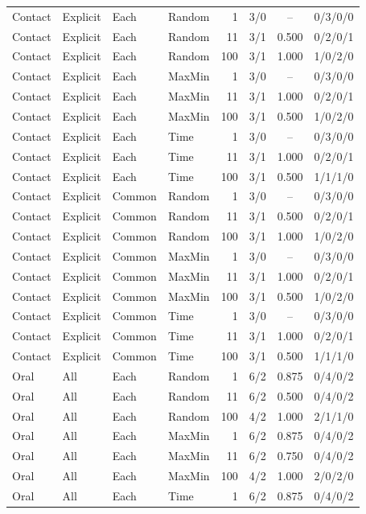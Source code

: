 \begin{longtable}{llllrrcc}
Contact & Explicit & Each & Random & 1 & 3/0 & -- & 0/3/0/0 \\
Contact & Explicit & Each & Random & 11 & 3/1 & 0.500 & 0/2/0/1 \\
Contact & Explicit & Each & Random & 100 & 3/1 & 1.000 & 1/0/2/0 \\
Contact & Explicit & Each & MaxMin & 1 & 3/0 & -- & 0/3/0/0 \\
Contact & Explicit & Each & MaxMin & 11 & 3/1 & 1.000 & 0/2/0/1 \\
Contact & Explicit & Each & MaxMin & 100 & 3/1 & 0.500 & 1/0/2/0 \\
Contact & Explicit & Each & Time & 1 & 3/0 & -- & 0/3/0/0 \\
Contact & Explicit & Each & Time & 11 & 3/1 & 1.000 & 0/2/0/1 \\
Contact & Explicit & Each & Time & 100 & 3/1 & 0.500 & 1/1/1/0 \\
Contact & Explicit & Common & Random & 1 & 3/0 & -- & 0/3/0/0 \\
Contact & Explicit & Common & Random & 11 & 3/1 & 0.500 & 0/2/0/1 \\
Contact & Explicit & Common & Random & 100 & 3/1 & 1.000 & 1/0/2/0 \\
Contact & Explicit & Common & MaxMin & 1 & 3/0 & -- & 0/3/0/0 \\
Contact & Explicit & Common & MaxMin & 11 & 3/1 & 1.000 & 0/2/0/1 \\
Contact & Explicit & Common & MaxMin & 100 & 3/1 & 0.500 & 1/0/2/0 \\
Contact & Explicit & Common & Time & 1 & 3/0 & -- & 0/3/0/0 \\
Contact & Explicit & Common & Time & 11 & 3/1 & 1.000 & 0/2/0/1 \\
Contact & Explicit & Common & Time & 100 & 3/1 & 0.500 & 1/1/1/0 \\
Oral & All & Each & Random & 1 & 6/2 & 0.875 & 0/4/0/2 \\
Oral & All & Each & Random & 11 & 6/2 & 0.500 & 0/4/0/2 \\
Oral & All & Each & Random & 100 & 4/2 & 1.000 & 2/1/1/0 \\
Oral & All & Each & MaxMin & 1 & 6/2 & 0.875 & 0/4/0/2 \\
Oral & All & Each & MaxMin & 11 & 6/2 & 0.750 & 0/4/0/2 \\
Oral & All & Each & MaxMin & 100 & 4/2 & 1.000 & 2/0/2/0 \\
Oral & All & Each & Time & 1 & 6/2 & 0.875 & 0/4/0/2 \\

\end{longtable}
